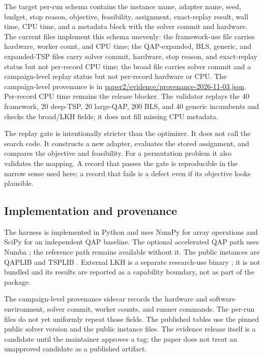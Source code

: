 \documentclass[11pt]{article}
\begin{document}
The target per-run schema contains the instance name, adapter name, seed, budget, stop reason,
objective, feasibility, assignment, exact-replay result, wall time, CPU time, and a metadata block
with the solver commit and hardware. The current files implement this schema unevenly: the
framework-use file carries hardware, worker count, and CPU time; the QAP-expanded, BLS, generic, and
expanded-TSP files carry solver commit, hardware, stop reason, and exact-replay status but not
per-record CPU time; the broad file carries solver commit and a campaign-level replay status but not
per-record hardware or CPU. The campaign-level provenance is in
\url{paper2/evidence/provenance-2026-11-03.json}. Per-record CPU time remains the release blocker. The
validator replays the 40 framework, 20 deep-TSP, 20 large-QAP, 200 BLS, and 40 generic incumbents and
checks the broad/LKH fields; it does not fill missing CPU metadata.

The replay gate is intentionally stricter than the optimizer. It does not call the search code. It
constructs a new adapter, evaluates the stored assignment, and compares the objective and
feasibility. For a permutation problem it also validates the mapping. A record that passes the gate
is reproducible in the narrow sense used here; a record that fails is a defect even if its objective
looks plausible.

\subsection{Implementation and provenance}

The harness is implemented in Python \citep{freshsolutions} and uses NumPy \citep{harris2020} for array operations and SciPy
\citep{virtanen2020} for an independent QAP baseline. The optional accelerated QAP path uses Numba
\citep{lam2015}; the reference path remains available without it. The public instances are QAPLIB
\citep{burkard1997} and TSPLIB \citep{reinelt1991}. External LKH is a separate research-use binary \citep{lkh3}; it is not
bundled and its results are reported as a capability boundary, not as part of the package.

The campaign-level provenance sidecar records the hardware and software environment, solver commit,
worker counts, and runner commands. The per-run files do not yet uniformly repeat those fields. The
published tables use the pinned public solver version and the public instance files. The evidence release itself is a
candidate until the maintainer approves a tag; the paper does not treat an unapproved candidate as a
published artifact.
\end{document}
